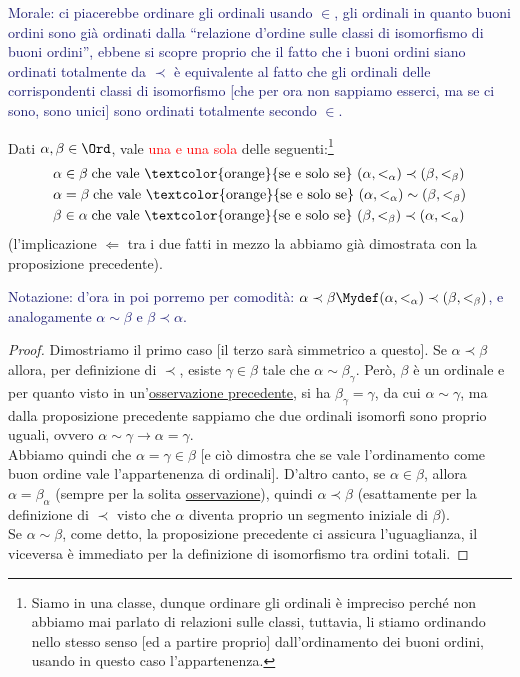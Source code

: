 \documentclass[11pt]{scrartcl}
\begin{document}
\textcolor{MidnightBlue}{Morale: ci piacerebbe ordinare gli ordinali usando $\in$, gli ordinali in quanto buoni ordini sono già ordinati dalla ``relazione d'ordine sulle classi di isomorfismo di buoni ordini'', ebbene si scopre proprio che il fatto che i buoni ordini siano ordinati totalmente da $\prec$ è equivalente al 
fatto che gli ordinali delle corrispondenti classi di isomorfismo [che per ora non sappiamo esserci, ma se ci sono, sono unici] sono ordinati totalmente secondo $\in$.}

\begin{theorem}
	Dati $\alpha,\beta \in\Ord$, vale \textcolor{red}{una e una sola} delle seguenti:\footnote{Siamo in una classe, dunque ordinare
	gli ordinali è impreciso perché non abbiamo mai parlato di relazioni sulle classi, tuttavia, li stiamo ordinando nello stesso senso [ed a partire proprio] dall'ordinamento
	dei buoni ordini, usando in questo caso l'appartenenza.}
	\begin{align*}
		& \alpha \in \beta \;\text{che vale \textcolor{orange}{se e solo se} $(\alpha,<_\alpha) \prec (\beta,<_\beta)$} \\
		& \alpha = \beta \;\text{che vale \textcolor{orange}{se e solo se} $(\alpha,<_\alpha) \sim (\beta,<_\beta)$} \\
		& \beta \in \alpha \;\text{che vale \textcolor{orange}{se e solo se} $(\beta,<_\beta) \prec (\alpha,<_\alpha)$}
	\end{align*}
	(l'implicazione $\Longleftarrow$ tra i due fatti in mezzo la abbiamo già dimostrata con la proposizione precedente).
\end{theorem}

\textcolor{MidnightBlue}{Notazione: d'ora in poi porremo per comodità: $\alpha \prec \beta \Mydef (\alpha,<_\alpha) \prec (\beta,<_\beta)$, e analogamente $\alpha \sim \beta$ e $\beta \prec \alpha$.}

\begin{proof}
	Dimostriamo il primo caso [il terzo sarà simmetrico a questo]. Se $\alpha \prec \beta$ allora, per definizione di $\prec$, esiste $\gamma \in \beta$ tale che $\alpha \sim \beta_{\gamma}$. Però, $\beta$ è un ordinale e
	per quanto visto in un'\hyperref[Ord_trans]{osservazione precedente}, si ha $\beta_\gamma = \gamma$, da cui $\alpha \sim \gamma$, ma dalla proposizione precedente sappiamo che due ordinali isomorfi sono proprio uguali, ovvero $\alpha \sim \gamma \rightarrow \alpha = \gamma$.\\
	Abbiamo quindi che $\alpha = \gamma \in \beta$ [e ciò dimostra che se vale l'ordinamento come buon ordine vale l'appartenenza di ordinali]. D'altro canto, se $\alpha \in \beta$, allora $\alpha = \beta_\alpha$ (sempre per la solita \hyperref[Ord_trans]{osservazione}), quindi 
	$\alpha \prec \beta$ (esattamente per la definizione di $\prec$ visto che $\alpha$ diventa proprio un segmento iniziale di $\beta$).\\
	Se $\alpha \sim \beta$, come detto, la proposizione precedente ci assicura l'uguaglianza, il viceversa è immediato per la definizione di isomorfismo tra ordini totali.
\end{proof}
\end{document}
